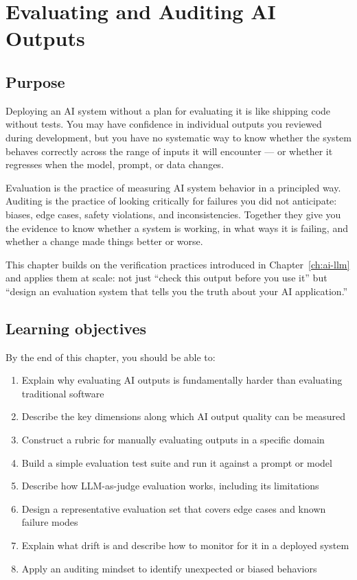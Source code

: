 \chapter{Evaluating and Auditing AI Outputs}
\label{ch:evaluating-ai}

\section*{Purpose}

Deploying an AI system without a plan for evaluating it is like shipping code without tests. You may have confidence in individual outputs you reviewed during development, but you have no systematic way to know whether the system behaves correctly across the range of inputs it will encounter --- or whether it regresses when the model, prompt, or data changes.

Evaluation is the practice of measuring AI system behavior in a principled way. Auditing is the practice of looking critically for failures you did not anticipate: biases, edge cases, safety violations, and inconsistencies. Together they give you the evidence to know whether a system is working, in what ways it is failing, and whether a change made things better or worse.

This chapter builds on the verification practices introduced in Chapter~\ref{ch:ai-llm} and applies them at scale: not just ``check this output before you use it'' but ``design an evaluation system that tells you the truth about your AI application.''

\section*{Learning objectives}

By the end of this chapter, you should be able to:

\begin{enumerate}[noitemsep,topsep=0pt]
  \item Explain why evaluating AI outputs is fundamentally harder than evaluating traditional software
  \item Describe the key dimensions along which AI output quality can be measured
  \item Construct a rubric for manually evaluating outputs in a specific domain
  \item Build a simple evaluation test suite and run it against a prompt or model
  \item Describe how LLM-as-judge evaluation works, including its limitations
  \item Design a representative evaluation set that covers edge cases and known failure modes
  \item Explain what drift is and describe how to monitor for it in a deployed system
  \item Apply an auditing mindset to identify unexpected or biased behaviors
\end{enumerate}

